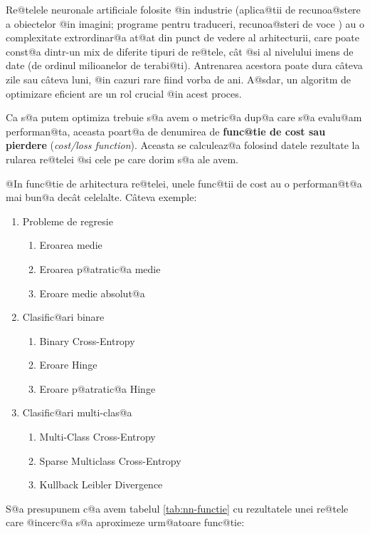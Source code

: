 Re@telele neuronale artificiale folosite @in industrie (aplica@tii de recunoa@stere a obiectelor @in imagini; programe pentru traduceri, recunoa@steri de voce ) au o complexitate extrordinar@a at@at din punct de vedere al arhitecturii, care poate const@a dintr-un mix de diferite tipuri de re@tele, c\^ at @si al nivelului imens de date (de ordinul milioanelor de terabi@ti). Antrenarea acestora poate dura c\^ ateva zile sau c\^ ateva luni, @in cazuri rare fiind vorba de ani. A@sdar, un algoritm de optimizare eficient are un rol crucial @in acest proces.

Ca s@a putem optimiza trebuie s@a avem o metric@a dup@a care s@a evalu@am performan@ta, aceasta poart@a de denumirea de \textbf{func@tie de cost sau pierdere} (\textsl{cost/loss function}). Aceasta se calculeaz@a folosind datele rezultate la rularea re@telei @si cele pe care dorim s@a ale avem. 

@In func@tie de arhitectura re@telei, unele func@tii de cost au o performan@t@a mai bun@a dec\^ at celelalte. C\^ ateva exemple:

\begin{enumerate}
	\item Probleme de regresie
	\begin{enumerate}
		\item Eroarea medie
		\item Eroarea p@atratic@a medie
		\item Eroare medie absolut@a
	\end{enumerate}
	\item Clasific@ari binare
	\begin{enumerate}
		\item Binary Cross-Entropy
		\item Eroare Hinge
		\item Eroare p@atratic@a Hinge
	\end{enumerate}
	\item Clasific@ari multi-clas@a
	\begin{enumerate}
		\item Multi-Class Cross-Entropy
		\item Sparse Multiclass Cross-Entropy
		\item Kullback Leibler Divergence
	\end{enumerate}
\end{enumerate}

S@a presupunem c@a avem tabelul \ref{tab:nn-functie} cu rezultatele unei re@tele care @incerc@a s@a aproximeze urm@atoare func@tie:

